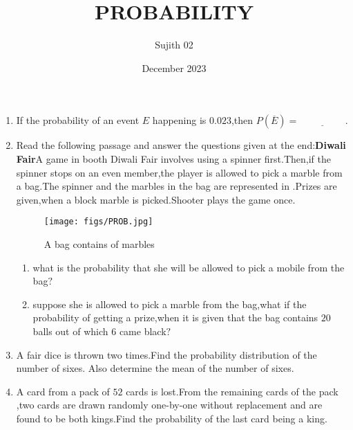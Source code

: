 \documentclass[12pt,-letter paper]{article}
\begin{document}
\title{PROBABILITY}
\author{Sujith 02}
\date{December 2023}
\maketitle
  \begin{enumerate}
	  \item If the probability of an event $E$ happening is $0.023$,then $P(\overline{E})=\underline{\hspace{2cm}}$.


	  \item Read the following passage and answer the questions given at the end:\newline\textbf{Diwali Fair}\newline A game in booth Diwali Fair involves using a spinner first.Then,if the spinner stops on an even member,the player is allowed to pick a marble from a bag.The spinner and the marbles in the bag are represented in .\newline Prizes are given,when a block marble is picked.Shooter plays the game once.
  
		\begin{figure}[H]
			\centering
			\texttt{[image: figs/PROB.jpg]}
			\caption{A bag contains of marbles}
			\label{fig:PROB.jpg}
  \end{figure}
\begin{enumerate}[label=(\roman*)]
 \item what is the probability that she will be allowed to pick a mobile from the bag$?$
  \item suppose she is allowed to pick a marble from the bag,what if the probability of getting a prize,when it is given that the bag contains $20$ balls out of which $6$ came black$?$
\end{enumerate}
 \item A fair dice is thrown two times.Find the 
probability distribution of the number of sixes. 
Also determine the mean of the number of sixes.
 \item A card from a pack of $52$ cards is lost.From the remaining cards of the pack ,two cards are drawn randomly one-by-one without replacement and are found to be both kings.Find the probability of the last card being a king.
\end{enumerate}
\end{document}
